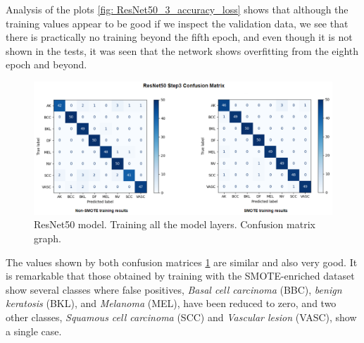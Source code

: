 Analysis of the plots \ref{fig: ResNet50_3_accuracy_loss} shows that although the training values appear to be good if we inspect the validation data, we see that there is practically no training beyond the fifth epoch, and even though it is not shown in the tests, it was seen that the network shows overfitting from the eighth epoch and beyond.

\begin{figure}[ht]
    \begin{center}
        \includegraphics[scale=0.60]{images/Building/Model RestNet50/model_RNet_3_confmat.png}
        \caption{ResNet50 model. Training all the model layers. Confusion matrix graph.}
    \label{fig: ResNet50_3_confmat}    
    \end{center}
\end{figure}

The values shown by both confusion matrices \ref{fig: ResNet50_3_confmat} are similar and also very good. It is remarkable that those obtained by training with the SMOTE-enriched dataset show several classes where false positives, \textit{Basal cell carcinoma} (BBC), \textit{benign keratosis} (BKL), and \textit{Melanoma} (MEL), have been reduced to zero, and two other classes, \textit{Squamous cell carcinoma} (SCC) and \textit{Vascular lesion} (VASC), show a single case.

